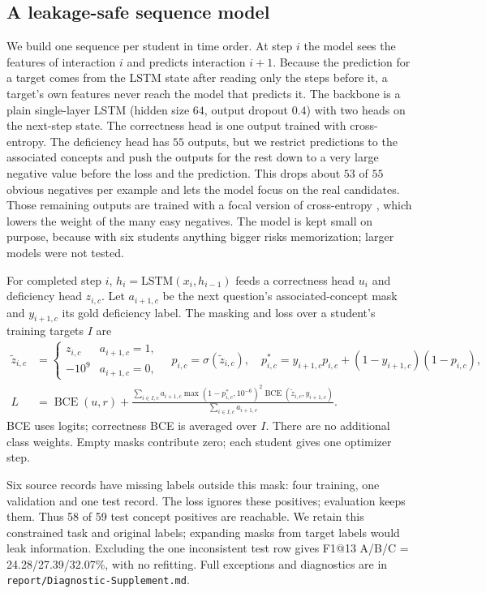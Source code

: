 \documentclass[11pt]{article}
\newcommand{\code}[1]{\texttt{\small #1}}
\begin{document}
\subsection{A leakage-safe sequence model}
We build one sequence per student in time order. At step $i$ the model sees the
features of interaction $i$ and predicts interaction $i\!+\!1$. Because the prediction
for a target comes from the LSTM state after reading only the steps before it, a
target's own features never reach the model that predicts it. The backbone is a plain
single-layer LSTM (hidden size $64$, output dropout $0.4$) with two heads on the next-step
state. The correctness head is one output trained with cross-entropy. The deficiency
head has $55$ outputs, but we restrict predictions to the associated
concepts and push the outputs for the rest down to a very large negative value before the
loss and the prediction. This drops about $53$ of $55$ obvious negatives per example
and lets the model focus on the real candidates. Those remaining outputs are trained
with a focal version of cross-entropy \cite{lin2017focal}, which lowers the weight of
the many easy negatives. The model is kept small on purpose, because with six students
anything bigger risks memorization; larger models were not tested.

For completed step $i$, $h_i=\mathrm{LSTM}(x_i,h_{i-1})$ feeds a correctness
head $u_i$ and deficiency head $z_{i,c}$. Let $a_{i+1,c}$ be the next question's
associated-concept mask and $y_{i+1,c}$ its gold deficiency label. The masking and
loss over a student's training targets $I$ are
\begin{align}
\tilde z_{i,c}&=\begin{cases}z_{i,c}&a_{i+1,c}=1,\\-10^9&a_{i+1,c}=0,\end{cases}
\quad p_{i,c}=\sigma(\tilde z_{i,c}),\quad
p^*_{i,c}=y_{i+1,c}p_{i,c}+(1-y_{i+1,c})(1-p_{i,c}),\label{eq:mask}\\
L&=\operatorname{BCE}(u,r)+
\frac{\sum_{i\in I,c}a_{i+1,c}\max(1-p^*_{i,c},10^{-6})^2\operatorname{BCE}(\tilde z_{i,c},y_{i+1,c})}
{\sum_{i\in I,c}a_{i+1,c}}.\label{eq:loss}
\end{align}
BCE uses logits; correctness BCE is averaged over $I$. There are no additional
class weights. Empty masks contribute zero; each student gives one optimizer step.

Six source records have missing labels outside this mask: four training, one validation
and one test record. The loss ignores these positives; evaluation keeps them. Thus
58 of 59 test concept positives are reachable. We retain this constrained task and
original labels; expanding masks from target labels would leak information. Excluding
the one inconsistent test row gives F1@13 A/B/C = 24.28/27.39/32.07\%, with no
refitting. Full exceptions and diagnostics are in \code{report/Diagnostic-Supplement.md}.
\end{document}
